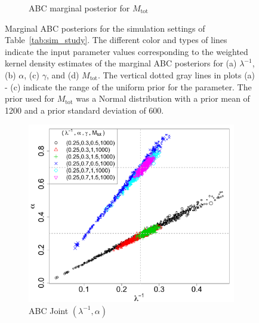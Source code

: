 \documentclass[12pt]{article}
\newcommand{\Mtot}{M_{\text{tot}}}
\begin{document}
\begin{figure}[htbp]
\begin{subfigure}{0.48\textwidth}
\caption{ABC marginal posterior for  $\Mtot$}\label{subfig:marg_mtot}
\end{subfigure}
%
 \caption{Marginal ABC posteriors for the simulation settings of Table~\ref{tab:sim_study}.  The different color and types of lines indicate the input parameter values corresponding to the weighted kernel density estimates of the marginal ABC posteriors for (a) $\lambda^{-1}$, (b) $\alpha$, (c) $\gamma$, and (d) $\Mtot$.  The vertical dotted gray lines in plots (a) - (c) indicate the range of the uniform prior for the parameter.  The prior used for $\Mtot$ was a Normal distribution with a prior mean of 1200 and a prior standard deviation of 600.
   }
   \label{fig:abc_pa_posterior}
\end{figure}


\begin{figure}[htbp]
   \centering
\begin{subfigure}{0.32\textwidth}
\centering
\includegraphics[width = \textwidth]{figures/joint_k_alpha.pdf} 
\caption{ABC Joint $(\lambda^{-1}, \alpha)$}\label{subfig:joint_alpha_k}
\end{subfigure}
\begin{subfigure}{0.32\textwidth}
\centering

\end{subfigure}
\end{figure}
\end{document}
